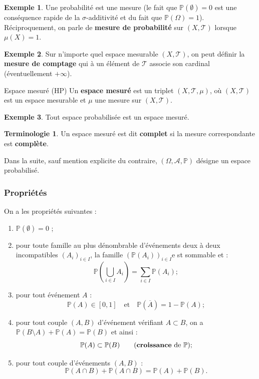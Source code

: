 \documentclass[french]{article}
\renewcommand{\P}{\mathbb{P}}
\theoremstyle{plain}
\theoremstyle{definition}
\newtheorem*{ex}{Exemple}
\newtheorem*{terminologie}{Terminologie}
\theoremstyle{remark}
\begin{document}
\begin{ex}
	Une probabilité est une mesure (le fait que $\P(\emptyset)=0$ est une conséquence rapide de la $\sigma$-additivité et du fait que $\P(\Omega)=1$). Réciproquement, on parle de \textbf{mesure de probabilité} sur $(X,\mathcal{T})$ lorsque $\mu(X)=1$.
\end{ex}

\begin{ex}
	Sur n'importe quel espace mesurable $(X,\mathcal{T})$, on peut définir la \textbf{mesure de comptage} qui à un élément de $\mathcal{T}$ associe son cardinal (éventuellement $+\infty$).
\end{ex}

\begin{dfn}{Espace mesuré (HP)}
	Un \textbf{espace mesuré} est un triplet $(X,\mathcal{T},\mu)$, où $(X,\mathcal{T})$ est un espace mesurable et $\mu$ une mesure sur $(X,\mathcal{T})$.
\end{dfn}

\begin{ex}
	Tout espace probabilisée est un espace mesuré.
\end{ex}

\begin{terminologie}
	Un espace mesuré est dit \textbf{complet} si la mesure correspondante est \textbf{complète}.
\end{terminologie}

Dans la suite, sauf mention explicite du contraire, $(\Omega,\mathcal{A},\P)$ désigne un espace probabilisé.

\subsubsection*{Propriétés}

\begin{thm}{}%
	On a les propriétés suivantes :
	\begin{enumerate}
		\item $\P(\emptyset)=0$ ;
		\item pour toute famille au plus dénombrable d'événements deux à deux incompatibles $(A_i)_{i\in I}$, la famille $(\P(A_i))_{i\in I}$e st sommable et : $$\P\left(\bigcup_{i\in I}A_i\right)=\sum_{i\in I}\P(A_i);$$
		\item pour tout événement $A$ :
		$$\P(A)\in[0,1]\quad\text{et}\quad\P(\overline{A})=1-\P(A);$$
		\item pour tout couple $(A,B)$ d'événement vérifiant $A\subset B$, on a $\P(B\setminus A)+\P(A)=\P(B)$ et ainsi :
		$$\P(A)\subset\P(B)\quad\quad(\text{\textbf{croissance} de }\P);$$
		\item pour tout couple d'événements $(A,B)$ : $$\P(A\cap B)+\P(A\cap B)=\P(A)+\P(B).$$
	\end{enumerate}
\end{thm}
\end{document}
